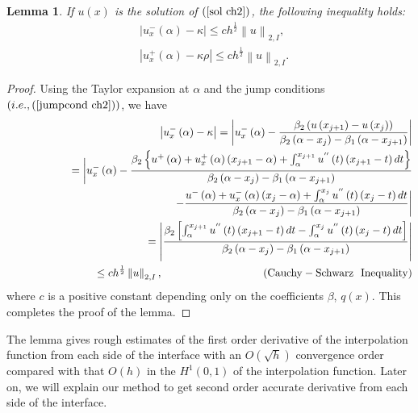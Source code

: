 \documentclass[11pt]{article}
\numberwithin{equation}{section}
\newtheorem{lemma}[theorem]{Lemma}
\begin{document}
\begin{lemma}{}
If $u\left(x\right)$ is the solution of $\left(\ref{sol ch2}\right)$, the following inequality holds:
\begin{equation}\label{lem ch2}
\begin{split}
&\left|u_{x}^{-}\left(\alpha\right)-\kappa\right|\leq ch^{\frac{1}{2}}\left\|u\right\|_{2,I},\\
&\left|u_{x}^{+}\left(\alpha\right)-\kappa\rho\right|\leq ch^{\frac{1}{2}}\left\|u\right\|_{2,I}.
\end{split}
\end{equation}
\end{lemma}
\begin{proof}
Using the Taylor expansion at $\alpha$ and the jump conditions $\left(i.e.,  \left(\ref{jumpcond ch2}\right)\right)$, we have
\begin{eqnarray*}
&&\left|u_{x}^{-}\left(\alpha\right)-\kappa\right|=\left|u_{x}^{-}\left(\alpha\right)-\frac{\beta_{2}\left(u\left(x_{j+1}\right)-u\left(x_{j}\right)\right)}{\beta_{2}\left(\alpha-x_{j}\right)-\beta_{1}\left(\alpha-x_{j+1}\right)}\right|\\
&&~~~~\quad~\qquad~=\bigg|u_{x}^{-}\left(\alpha\right)-\frac{\beta_{2}\left\{u^{+}\left(\alpha\right)+u^{+}_{x}\left(\alpha\right)\left(x_{j+1}-\alpha\right)+\int_\alpha^{x_{j+1}} u^{''}\left(t\right)\left(x_{j+1}-t\right)dt\right\}}{\beta_{2}\left(\alpha-x_{j}\right)-\beta_{1}\left(\alpha-x_{j+1}\right)}\\
&&~~\qquad\qquad\quad~~~-\frac{u^{-}\left(\alpha\right)+u^{-}_{x}\left(\alpha\right)\left(x_{j}-\alpha\right)+\int_\alpha^{x_{j}}u^{''}\left(t\right)\left(x_{j}-t\right)dt}{\beta_{2}\left(\alpha-x_{j}\right)-\beta_{1}\left(\alpha-x_{j+1}\right)}\bigg|\\
&&~~~\quad~\qquad~~=\left|\frac{\beta_{2}\left[\int_\alpha^{x_{j+1}} u^{''}\left(t\right)\left(x_{j+1}-t\right)dt-\int_\alpha^{x_{j}} u^{''}\left(t\right)\left(x_{j}-t\right)dt\right]}{\beta_{2}\left(\alpha-x_{j}\right)-\beta_{1}\left(\alpha-x_{j+1}\right)}\right| %
\\
&&~~~\quad~\qquad~~\leq ch^{\frac{1}{2}}\left\|u\right\|_{2,I}, \qquad\qquad\qquad~~~~\qquad(\rm{Cauchy-Schwarz ~~ Inequality})
\end{eqnarray*}
where $c$ is a positive constant depending only on the coefficients $\beta$, $q(x)$.
This completes the proof of the lemma.
\end{proof}

The lemma gives rough estimates of the first order derivative of the interpolation function
from each side of the interface with an $O(\sqrt{h})$ convergence order
compared with that $O(h)$ in the $H^1(0,1)$ of the interpolation function.
Later on, we will explain our method to get  second order accurate derivative
from each side of the interface.
\end{document}
